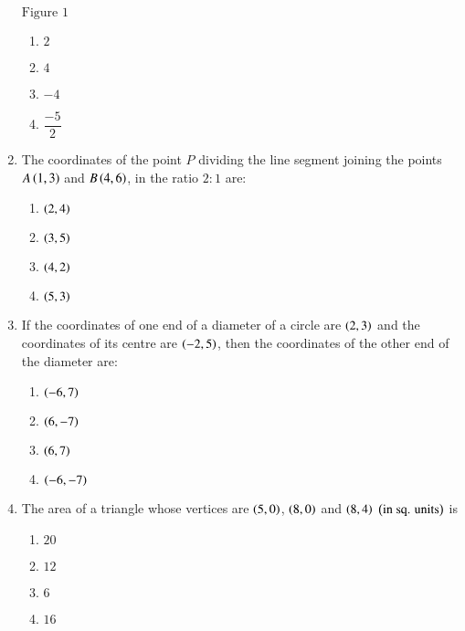\documentclass[journal,12pt,onecolumn]{IEEEtran}
\theoremstyle{remark}
\begin{document}
\begin{enumerate}
\begin{figure} [h]
\begin{tikzpicture}[scale=0.7]
\end{tikzpicture}
\end{figure}
\begin{center}
$\text{Figure } 1$
\end{center}
\begin{enumerate}
\item $2$\\
\item $4$\\
\item $-4$\\
\item $\dfrac{-5}{2}$\\
\end{enumerate}
\item The coordinates of the point $P$ dividing the line segment joining the points $A\brak{1,3}$ and $B\brak{4,6}$, in the ratio $2:1$ are:
\begin{enumerate}
\item $\brak{2,4}$\\
\item $\brak{3,5}$\\
\item $\brak{4,2}$\\
\item $\brak{5,3}$\\
\end{enumerate}
\item If the coordinates of one end of a diameter of a circle are $\brak{2,3}$ and the coordinates of its centre are $\brak{-2,5}$, then the coordinates of the other end of the diameter are:
\begin{enumerate}
\item $\brak{-6,7}$\\
\item $\brak{6,-7}$\\
\item $\brak{6,7}$\\
\item $\brak{-6,-7}$\\
\end{enumerate}
\item The area of a triangle whose vertices are $\brak{5,0}$, $\brak{8,0}$ and $\brak{8,4}$ $\brak{\text{in sq. units}}$ is
\begin{enumerate}
\item $20$\\
\item $12$\\
\item $6$\\
\item $16$\\
\end{enumerate}


\end{enumerate}
\end{document}

